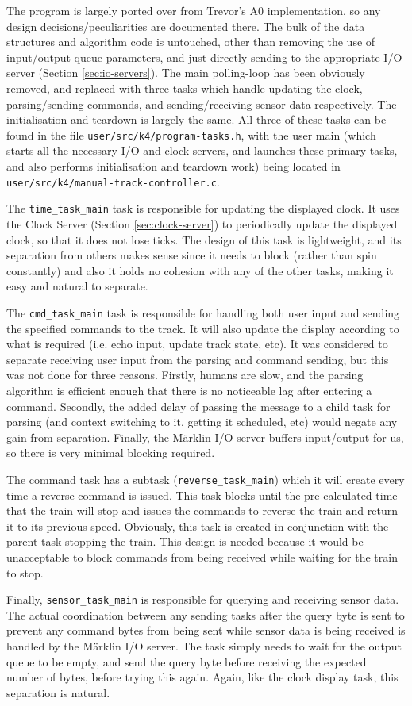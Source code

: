 \documentclass[12pt, titlepage]{article}
\begin{document}
    The program is largely ported over from Trevor's A0 implementation, so any design decisions/peculiarities are documented there. The bulk of the data structures and algorithm code is untouched, other than removing the use of input/output queue parameters, and just directly sending to the appropriate I/O server (Section \ref{sec:io-servers}). The main polling-loop has been obviously removed, and replaced with three tasks which handle updating the clock, parsing/sending commands, and sending/receiving sensor data respectively. The initialisation and teardown is largely the same. All three of these tasks can be found in the file \verb`user/src/k4/program-tasks.h`, with the user main (which starts all the necessary I/O and clock servers, and launches these primary tasks, and also performs initialisation and teardown work) being located in \verb`user/src/k4/manual-track-controller.c`. 
    
    The \verb`time_task_main` task is responsible for updating the displayed clock. It uses the Clock Server (Section \ref{sec:clock-server}) to periodically update the displayed clock, so that it does not lose ticks. The design of this task is lightweight, and its separation from others makes sense since it needs to block (rather than spin constantly) and also it holds no cohesion with any of the other tasks, making it easy and natural to separate.
    
    The \verb`cmd_task_main` task is responsible for handling both user input and sending the specified commands to the track. It will also update the display according to what is required (i.e. echo input, update track state, etc). It was considered to separate receiving user input from the parsing and command sending, but this was not done for three reasons. Firstly, humans are slow, and the parsing algorithm is efficient enough that there is no noticeable lag after entering a command. Secondly, the added delay of passing the message to a child task for parsing (and context switching to it, getting it scheduled, etc) would negate any gain from separation. Finally, the Märklin I/O server buffers input/output for us, so there is very minimal blocking required.
    
    The command task has a subtask (\verb`reverse_task_main`) which it will create every time a reverse command is issued. This task blocks until the pre-calculated time that the train will stop and issues the commands to reverse the train and return it to its previous speed. Obviously, this task is created in conjunction with the parent task stopping the train. This design is needed because it would be unacceptable to block commands from being received while waiting for the train to stop.
    
    Finally, \verb`sensor_task_main` is responsible for querying and receiving sensor data. The actual coordination between any sending tasks after the query byte is sent to prevent any command bytes from being sent while sensor data is being received is handled by the Märklin I/O server. The task simply needs to wait for the output queue to be empty, and send the query byte before receiving the expected number of bytes, before trying this again. Again, like the clock display task, this separation is natural.
\end{document}
